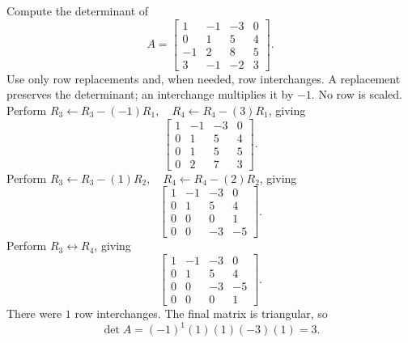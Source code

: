 \goal Compute the determinant of
\[A=\begin{bmatrix}1&-1&-3&0\\0&1&5&4\\-1&2&8&5\\3&-1&-2&3\end{bmatrix}.\]
Use only row replacements and, when needed, row interchanges. A replacement preserves the determinant; an interchange multiplies it by $-1$. No row is scaled.
Perform $R_3\leftarrow R_3-(-1)R_1,\quad R_4\leftarrow R_4-(3)R_1$, giving
\[
\begin{bmatrix}1&-1&-3&0\\0&1&5&4\\0&1&5&5\\0&2&7&3\end{bmatrix}.
\]
Perform $R_3\leftarrow R_3-(1)R_2,\quad R_4\leftarrow R_4-(2)R_2$, giving
\[
\begin{bmatrix}1&-1&-3&0\\0&1&5&4\\0&0&0&1\\0&0&-3&-5\end{bmatrix}.
\]
Perform $R_3\leftrightarrow R_4$, giving
\[
\begin{bmatrix}1&-1&-3&0\\0&1&5&4\\0&0&-3&-5\\0&0&0&1\end{bmatrix}.
\]
There were $1$ row interchanges. The final matrix is triangular, so
\[\det A=(-1)^{1}(1)(1)(-3)(1)=3.\]


